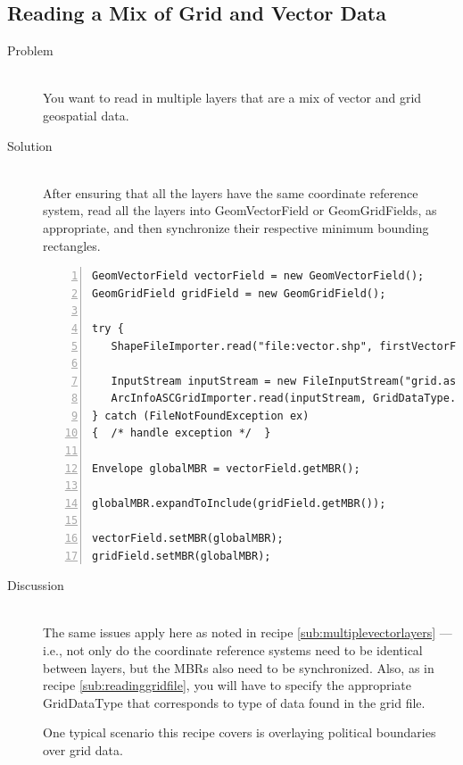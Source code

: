 \documentclass[twoside,10pt]{book}
\newcommand\class[1]{\index{Classes!{#1}}\textsf{#1}}
\begin{document}

\subsection{Reading a Mix of Grid and Vector Data}
\label{sub:readingmixofdata}

\begin{description}
\item[Problem]~\\
You want to read in multiple layers that are a mix of vector and grid geospatial data.

\item[Solution]~\\
After ensuring that all the layers have the same coordinate reference system, read all the layers into GeomVectorField or GeomGridFields, as appropriate, and then synchronize their respective minimum bounding rectangles.
\begin{Verbatim}[frame=lines,framesep=5mm,numbers=left,commandchars=+\[\]]
GeomVectorField vectorField = new GeomVectorField();
GeomGridField gridField = new GeomGridField();

try {
   ShapeFileImporter.read("file:vector.shp", firstVectorField);

   InputStream inputStream = new FileInputStream("grid.asc");
   ArcInfoASCGridImporter.read(inputStream, GridDataType.INTEGER, gridField);
} catch (FileNotFoundException ex)
{  /* handle exception */  }

Envelope globalMBR = vectorField.getMBR();

globalMBR.expandToInclude(gridField.getMBR());

vectorField.setMBR(globalMBR);
gridField.setMBR(globalMBR);
\end{Verbatim}

\item[Discussion ]~\\
The same issues apply here as noted in recipe
\ref{sub:multiplevectorlayers} --- i.e., not only do the coordinate
reference systems need to be identical between layers, but the MBRs
also need to be synchronized.  Also, as in recipe
\ref{sub:readinggridfile}, you will have to specify the appropriate
\class{GridDataType} that corresponds to type of data found in the
grid file.

One typical scenario this recipe covers is overlaying political
boundaries over grid data.
\end{description}
\end{document}
